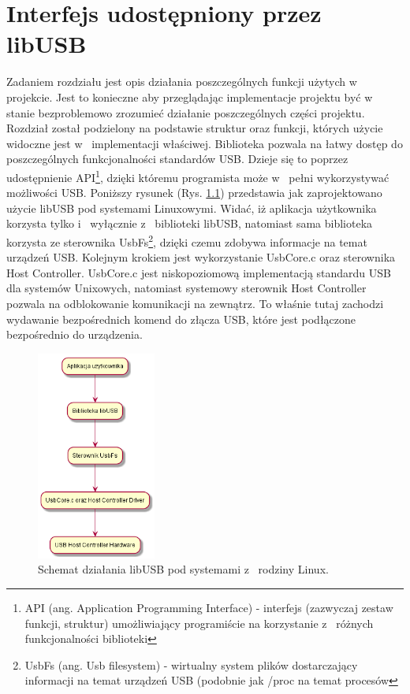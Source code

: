 \documentclass{BscUS}
\begin{document}
\chapter{Interfejs udostępniony przez libUSB}
\label{libUsbChapter}
\indent Zadaniem rozdziału jest opis działania poszczególnych funkcji użytych w~ projekcie. Jest to konieczne aby przeglądając implementacje projektu być w~ stanie bezproblemowo zrozumieć działanie poszczególnych części projektu. Rozdział został podzielony na podstawie struktur oraz funkcji, których użycie widoczne jest w~ implementacji właściwej. \cite{libusbDoc}
\newline
\indent Biblioteka pozwala na łatwy dostęp do poszczególnych funkcjonalności standardów USB. Dzieje się to poprzez udostępnienie API\footnote{API (ang. Application Programming Interface) - interfejs (zazwyczaj zestaw funkcji, struktur) umożliwiający programiście na korzystanie z~ różnych funkcjonalności biblioteki}, dzięki któremu programista może w~ pełni wykorzystywać możliwości USB. Poniższy rysunek (Rys. \ref{fig:libUsbSchemaLinux}) przedstawia jak zaprojektowano użycie libUSB pod systemami Linuxowymi. Widać, iż aplikacja użytkownika korzysta tylko i~ wyłącznie z~ biblioteki libUSB, natomiast sama biblioteka korzysta ze sterownika UsbFs\footnote{UsbFs (ang. Usb filesystem) - wirtualny system plików dostarczający informacji na temat urządzeń USB (podobnie jak /proc na temat procesów}, dzięki czemu zdobywa informacje na temat urządzeń USB. Kolejnym krokiem jest wykorzystanie UsbCore.c oraz sterownika Host Controller. UsbCore.c jest niskopoziomową implementacją standardu USB dla systemów Unixowych, natomiast systemowy sterownik Host Controller pozwala na odblokowanie komunikacji na zewnątrz. To właśnie tutaj zachodzi wydawanie bezpośrednich komend do złącza USB, które jest podłączone bezpośrednio do urządzenia. 
\begin{figure}[H]
\centering
\includegraphics[width=0.35\textwidth]{./img/libUsbSchemaLinux}
\caption{Schemat działania libUSB pod systemami z~ rodziny Linux.} 
\label{fig:libUsbSchemaLinux}
\end{figure}
\end{document}
